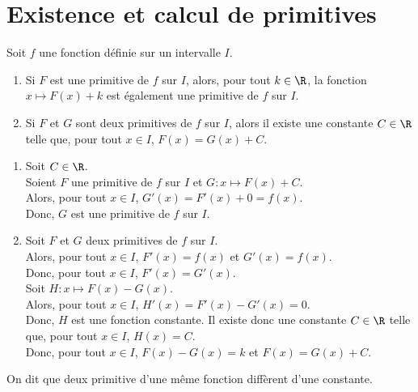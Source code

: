 \documentclass[a4paper,11pt,cours]{nsi} %
\begin{document}
\section{Existence et calcul de primitives}
\begin{propriete}[]
    Soit $f$ une fonction définie sur un intervalle $I$.
    \begin{enumerate}[label=\textbullet]
        \item Si $F$ est une primitive de $f$ sur $I$, alors, pour tout $k\in\R$, la fonction $x\mapsto F(x)+k$ est également une primitive de $f$ sur $I$.
        \item Si $F$ et $G$ sont deux primitives de $f$ sur $I$, alors il existe une constante $C\in\R$ telle que, pour tout $x\in I$, $F(x)=G(x)+C$.
    \end{enumerate}
\end{propriete}
    
\begin{demonstration}
    \begin{enumerate}[label=\textbullet]
        \item Soit $C\in\R$.\\
        Soient $F$ une primitive de $f$ sur $I$ et $G:x\mapsto F(x)+C$.\\
        Alors, pour tout $x\in I$, $G'(x)=F'(x)+0=f(x)$.\\
        Donc, $G$ est une primitive de $f$ sur $I$.
        \item Soit $F$ et $G$ deux primitives de $f$ sur $I$.\\
        Alors, pour tout $x\in I$, $F'(x)=f(x)$ et $G'(x)=f(x)$.\\
        Donc, pour tout $x\in I$, $F'(x)=G'(x)$.\\
        Soit $H:x\mapsto F(x)-G(x)$.\\
        Alors, pour tout $x\in I$, $H'(x)=F'(x)-G'(x)=0$.\\
        Donc, $H$ est une fonction constante. Il existe donc une constante $C\in\R$ telle que, pour tout $x\in I$, $H(x)=C$.\\
        Donc, pour tout $x\in I$, $F(x)-G(x)=k$ et $F(x)=G(x)+C$.
    \end{enumerate}
\end{demonstration}

\begin{remarque}[]
    On dit que deux primitive d'une même fonction diffèrent d'une constante.
\end{remarque}
\end{document}
